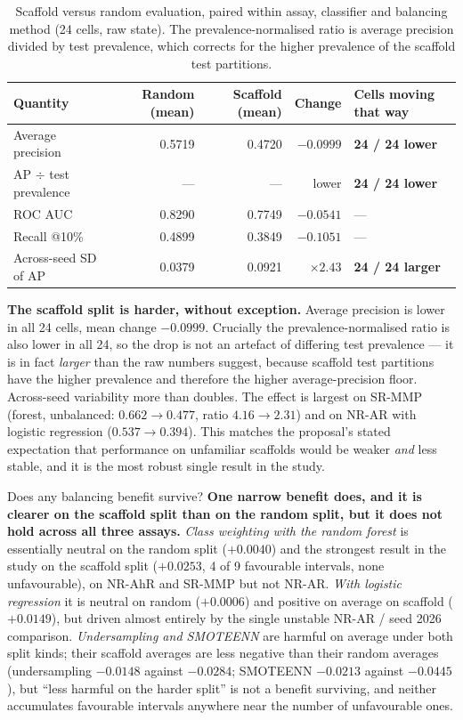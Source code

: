 \documentclass[10pt,letterpaper]{article}
\begin{document}
\begin{table}[!htbp]
\centering
\small
\caption{Scaffold versus random evaluation, paired within assay, classifier and balancing method (24
cells, raw state). The prevalence-normalised ratio is average precision divided by test prevalence,
which corrects for the higher prevalence of the scaffold test partitions.}
\label{tab:scaffvrand}
\begin{tabular}{@{}lrrrl@{}}
\toprule
Quantity & Random (mean) & Scaffold (mean) & Change & Cells moving that way \\
\midrule
Average precision & 0.5719 & 0.4720 & $-0.0999$ & \textbf{24 / 24 lower} \\
AP $\div$ test prevalence & --- & --- & lower & \textbf{24 / 24 lower} \\
ROC AUC & 0.8290 & 0.7749 & $-0.0541$ & --- \\
Recall @10\% & 0.4899 & 0.3849 & $-0.1051$ & --- \\
Across-seed SD of AP & 0.0379 & 0.0921 & $\times 2.43$ & \textbf{24 / 24 larger} \\
\bottomrule
\end{tabular}
\end{table}

\textbf{The scaffold split is harder, without exception.} Average precision is lower in all 24 cells,
mean change $-0.0999$. Crucially the prevalence-normalised ratio is also lower in all 24, so the drop
is not an artefact of differing test prevalence --- it is in fact \emph{larger} than the raw numbers
suggest, because scaffold test partitions have the higher prevalence and therefore the higher
average-precision floor. Across-seed variability more than doubles. The effect is largest on SR-MMP
(forest, unbalanced: $0.662 \to 0.477$, ratio $4.16 \to 2.31$) and on NR-AR with logistic regression
($0.537 \to 0.394$). This matches the proposal's stated expectation that performance on unfamiliar
scaffolds would be weaker \emph{and} less stable, and it is the most robust single result in the
study.

Does any balancing benefit survive? \textbf{One narrow benefit does, and it is clearer on the
scaffold split than on the random split, but it does not hold across all three assays.}
\emph{Class weighting with the random forest} is essentially neutral on the random split
($+0.0040$) and the strongest result in the study on the scaffold split ($+0.0253$, 4 of 9
favourable intervals, none unfavourable), on NR-AhR and SR-MMP but not NR-AR. \emph{With logistic
regression} it is neutral on random ($+0.0006$) and positive on average on scaffold ($+0.0149$), but
driven almost entirely by the single unstable NR-AR / seed 2026 comparison. \emph{Undersampling and
SMOTEENN} are harmful on average under both split kinds; their scaffold averages are less negative
than their random averages (undersampling $-0.0148$ against $-0.0284$; SMOTEENN $-0.0213$ against
$-0.0445$), but ``less harmful on the harder split'' is not a benefit surviving, and neither
accumulates favourable intervals anywhere near the number of unfavourable ones.
\end{document}
